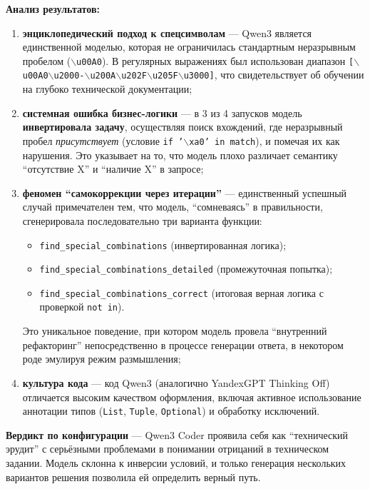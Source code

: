 \textbf{Анализ результатов:}
\begin{enumerate}
    \item \textbf{энциклопедический подход к спецсимволам} --- Qwen3 является единственной моделью, которая не ограничилась стандартным неразрывным пробелом (\texttt{$\backslash$u00A0}). В регулярных выражениях был использован диапазон \texttt{[$\backslash$u00A0$\backslash$u2000-$\backslash$u200A$\backslash$u202F$\backslash$u205F$\backslash$u3000]}, что свидетельствует об обучении на глубоко технической документации;

    \item \textbf{системная ошибка бизнес-логики} --- в 3 из 4 запусков модель \textbf{инвертировала задачу}, осуществляя поиск вхождений, где неразрывный пробел \textit{присутствует} (условие \texttt{if '$\backslash$xa0' in match}), и помечая их как нарушения. Это указывает на то, что модель плохо различает семантику ``отсутствие X'' и ``наличие X'' в запросе;

    \item \textbf{феномен ``самокоррекции через итерации''} --- единственный успешный случай примечателен тем, что модель, ``сомневаясь'' в правильности, сгенерировала последовательно три варианта функции:
    \begin{itemize}
        \item \texttt{find\_special\_combinations} (инвертированная логика);
        \item \texttt{find\_special\_combinations\_detailed} (промежуточная попытка);
        \item \texttt{find\_special\_combinations\_correct} (итоговая верная логика с проверкой \texttt{not in}).
    \end{itemize}
    Это уникальное поведение, при котором модель провела ``внутренний рефакторинг'' непосредственно в процессе генерации ответа, в некотором роде эмулируя режим размышления;

    \item \textbf{культура кода} --- код Qwen3 (аналогично YandexGPT Thinking Off) отличается высоким качеством оформления, включая активное использование аннотации типов (\texttt{List}, \texttt{Tuple}, \texttt{Optional}) и обработку исключений.
\end{enumerate}

\textbf{Вердикт по конфигурации} --- Qwen3 Coder проявила себя как ``технический эрудит'' с серьёзными проблемами в понимании отрицаний в техническом задании. Модель склонна к инверсии условий, и только генерация нескольких вариантов решения позволила ей определить верный путь.


